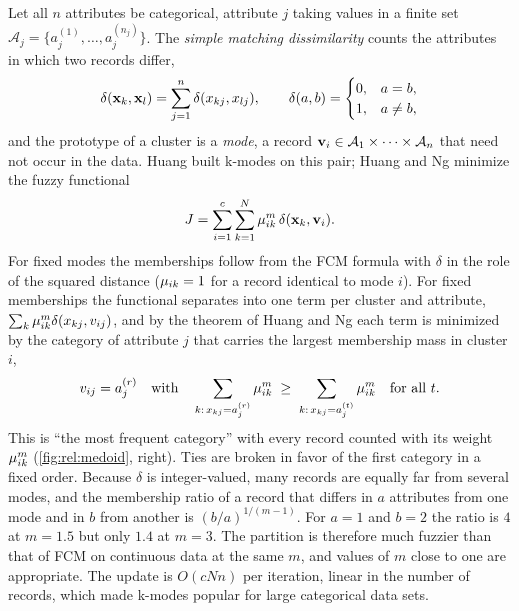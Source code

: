 Let all $n$ attributes be categorical, attribute $j$ taking values in a finite set $\mathcal{A}_j=\{a_j^{(1)},\dots,a_j^{(n_j)}\}$. The \emph{simple matching dissimilarity} counts the attributes in which two records differ,
\begin{equation}
  \delta(\mathbf{x}_k,\mathbf{x}_l)=\sum_{j=1}^{n}\delta(x_{kj},x_{lj}),\qquad
  \delta(a,b)=\begin{cases}0,&a=b,\\1,&a\neq b,\end{cases}
  \label{eq:rel:matching}
\end{equation}
and the prototype of a cluster is a \emph{mode}, a record $\mathbf{v}_i\in\mathcal{A}_1\times\dots\times\mathcal{A}_n$ that need not occur in the data. Huang \cite{huang:1998:kprototypes} built k-modes on this pair; Huang and Ng \cite{huang:1999:fuzzykmodes} minimize the fuzzy functional
\begin{equation}
  J=\sum_{i=1}^{c}\sum_{k=1}^{N}\mu_{ik}^m\,\delta(\mathbf{x}_k,\mathbf{v}_i).
  \label{eq:rel:kmodes}
\end{equation}
For fixed modes the memberships follow from the FCM formula with $\delta$ in the role of the squared distance ($\mu_{ik}=1$ for a record identical to mode $i$). For fixed memberships the functional separates into one term per cluster and attribute, $\sum_k\mu_{ik}^m\delta(x_{kj},v_{ij})$, and by the theorem of Huang and Ng each term is minimized by the category of attribute $j$ that carries the largest membership mass in cluster $i$,
\begin{equation}
  v_{ij}=a_j^{(r)}\quad\text{with}\quad
  \sum_{k:\,x_{kj}=a_j^{(r)}}\mu_{ik}^m\;\ge\;\sum_{k:\,x_{kj}=a_j^{(t)}}\mu_{ik}^m\quad\text{for all }t .
  \label{eq:rel:mode}
\end{equation}
This is ``the most frequent category'' with every record counted with its weight $\mu_{ik}^m$ (\cref{fig:rel:medoid}, right). Ties are broken in favor of the first category in a fixed order. Because $\delta$ is integer-valued, many records are equally far from several modes, and the membership ratio of a record that differs in $a$ attributes from one mode and in $b$ from another is $(b/a)^{1/(m-1)}$. For $a=1$ and $b=2$ the ratio is $4$ at $m=1.5$ but only $1.4$ at $m=3$. The partition is therefore much fuzzier than that of FCM on continuous data at the same $m$, and values of $m$ close to one are appropriate. The update is $O(cNn)$ per iteration, linear in the number of records, which made k-modes popular for large categorical data sets.

